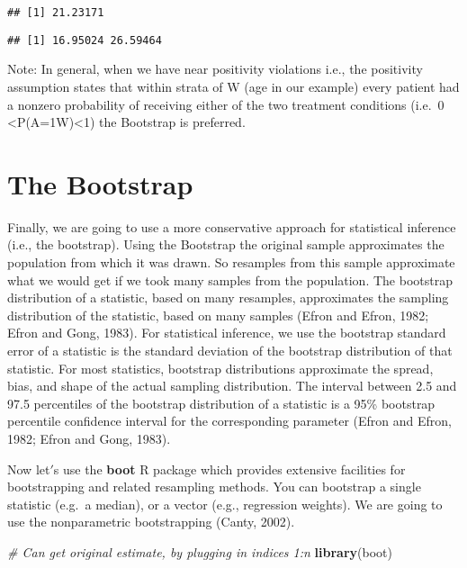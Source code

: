 \documentclass[]{article}
\newenvironment{Shaded}{\begin{snugshade}}{\end{snugshade}}
\newcommand{\CommentTok}[1]{\textcolor[rgb]{0.56,0.35,0.01}{\textit{#1}}}
\newcommand{\KeywordTok}[1]{\textcolor[rgb]{0.13,0.29,0.53}{\textbf{#1}}}
\newcommand{\NormalTok}[1]{#1}
\begin{document}
\begin{verbatim}
## [1] 21.23171
\end{verbatim}

\begin{verbatim}
## [1] 16.95024 26.59464
\end{verbatim}

Note: In general, when we have near positivity violations i.e., the
positivity assumption states that within strata of W (age in our
example) every patient had a nonzero probability of receiving either of
the two treatment conditions (i.e.~0
\textless P(A=1\textbar W)\textless1) the Bootstrap is preferred.

\hypertarget{the-bootstrap}{%
\section{The Bootstrap}\label{the-bootstrap}}

Finally, we are going to use a more conservative approach for
statistical inference (i.e., the bootstrap). Using the Bootstrap the
original sample approximates the population from which it was drawn. So
resamples from this sample approximate what we would get if we took many
samples from the population. The bootstrap distribution of a statistic,
based on many resamples, approximates the sampling distribution of the
statistic, based on many samples (Efron and Efron, 1982; Efron and Gong,
1983). For statistical inference, we use the bootstrap standard error of
a statistic is the standard deviation of the bootstrap distribution of
that statistic. For most statistics, bootstrap distributions approximate
the spread, bias, and shape of the actual sampling distribution. The
interval between 2.5 and 97.5 percentiles of the bootstrap distribution
of a statistic is a 95\% bootstrap percentile confidence interval for
the corresponding parameter (Efron and Efron, 1982; Efron and Gong,
1983).

Now let\('\)s use the \textbf{boot} R package which provides extensive
facilities for bootstrapping and related resampling methods. You can
bootstrap a single statistic (e.g.~a median), or a vector (e.g.,
regression weights). We are going to use the nonparametric bootstrapping
(Canty, 2002).

\begin{Shaded}
\begin{Highlighting}[]
\CommentTok{# Can get original estimate, by plugging in indices 1:n}
\KeywordTok{library}\NormalTok{(boot)}
\end{Highlighting}
\end{Shaded}
\end{document}

